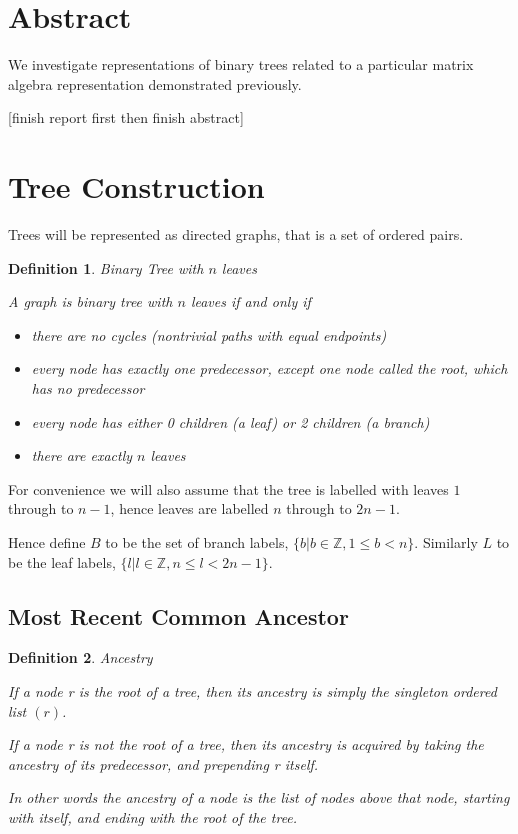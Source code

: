 \documentclass{report}
\begin{document}
\newtheorem{definition}{Definition}

\section{Abstract}

We investigate representations of binary trees related to a particular matrix
algebra representation demonstrated previously.

[finish report first then finish abstract]

\section{Tree Construction}

Trees will be represented as directed graphs, that is a set of ordered pairs.

\begin{definition} Binary Tree with $n$ leaves

	A graph is binary tree with $n$ leaves if and only if
	\begin{itemize}
		\item there are no cycles (nontrivial paths with equal endpoints)
		\item every node has exactly one predecessor, except one node called the root, which has no predecessor
		\item every node has either 0 children (a leaf) or 2 children (a branch)
		\item there are exactly $n$ leaves
	\end{itemize}
\end{definition}

For convenience we will also assume that the tree is labelled with leaves $1$ through to $n-1$,
hence leaves are labelled $n$ through to $2n-1$.

Hence define $B$ to be the set of branch labels, $\{b | b \in \mathds{Z}, 1 \leq b < n\}$.
Similarly $L$ to be the leaf labels, $\{l | l \in \mathds{Z}, n \leq l < 2n-1\}$.

\subsection{Most Recent Common Ancestor}

\begin{definition} Ancestry

	If a node r is the root of a tree, then its ancestry is simply the singleton ordered list $(r)$.

	If a node r is not the root of a tree, then its ancestry is acquired by taking the ancestry of its predecessor, and prepending r itself.

	In other words the ancestry of a node is the list of nodes above that node, starting with itself, and ending with the root of the tree.
\end{definition}
\end{document}
